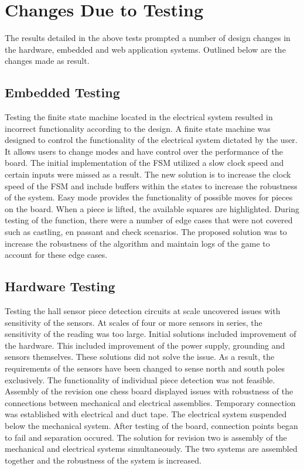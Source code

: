 \documentclass[12pt, titlepage]{article}
\begin{document}
\restoregeometry

\section{Changes Due to Testing}
The results detailed in the above tests prompted a number of design changes in 
the hardware, embedded and web application systems. Outlined below are the 
changes made as result. 

\subsection{Embedded Testing} 
Testing the finite state machine located in the electrical system resulted in 
incorrect functionality according to the design. A finite state machine was 
designed to control the functionality of the electrical system dictated by the
user. It allows users to change modes and have control over the performance 
of the board. The initial implementation of the FSM utilized a slow clock speed
and certain inputs were missed as a result. The new solution is to increase the
clock speed of the FSM and include buffers within the states to increase the
robustness of the system. 
\newline
\newline
Easy mode provides the functionality of possible moves for pieces on the board.
When a piece is lifted, the available squares are highlighted. During testing of 
the function, there were a number of edge cases that were not covered such as 
castling, en passant and check scenarios. The proposed solution was to increase
the robustness of the algorithm and maintain logs of the game to account for
these edge cases. 

\subsection{Hardware Testing}
Testing the hall sensor piece detection circuits at scale uncovered issues
with sensitivity of the sensors. At scales of four or more sensors in series, 
the sensitivity of the reading was too large. Initial solutions included 
improvement of the hardware. This included improvement of the power supply, 
grounding and sensors themselves. These solutions did not solve the issue. As 
a result, the requirements of the sensors have been changed to sense north and 
south poles exclusively. The functionality of individual piece detection was not
feasible. 
\newline
\newline
Assembly of the revision one chess board displayed issues with robustness of the
connections between mechanical and electrical assemblies. Temporary connection 
was established with electrical and duct tape. The electrical system suspended 
below the mechanical system. After testing of the board, connection points began 
to fail and separation occured. The solution for revision two is assembly of the
mechanical and electrical systems simultaneously. The two systems are assembled 
together and the robustness of the system is increased.
\end{document}
